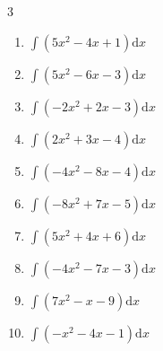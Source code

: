\begin{multicols}{3}
\begin{enumerate}
\columnbreak %

\resetques

  \item $\displaystyle \int \left( 5x^{2}-4x+1 \right) \mathrm{d}x$


  \item $\displaystyle \int \left( 5x^{2}-6x-3 \right) \mathrm{d}x$


  \item $\displaystyle \int \left( -2x^{2}+2x-3 \right) \mathrm{d}x$


  \item $\displaystyle \int \left( 2x^{2}+3x-4 \right) \mathrm{d}x$


  \item $\displaystyle \int \left( -4x^{2}-8x-4 \right) \mathrm{d}x$


  \item $\displaystyle \int \left( -8x^{2}+7x-5 \right) \mathrm{d}x$


  \item $\displaystyle \int \left( 5x^{2}+4x+6 \right) \mathrm{d}x$


  \item $\displaystyle \int \left( -4x^{2}-7x-3 \right) \mathrm{d}x$


  \item $\displaystyle \int \left( 7x^{2}-x-9 \right) \mathrm{d}x$


  \item $\displaystyle \int \left( -x^{2}-4x-1 \right) \mathrm{d}x$


\end{enumerate}
\end{multicols}
